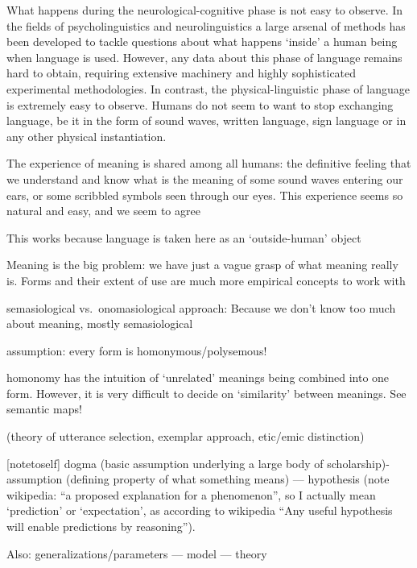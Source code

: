 What happens during the neurological-cognitive phase is not easy to observe. In the fields of psycholinguistics and neurolinguistics a large arsenal of methods has been developed to tackle questions about what happens `inside' a human being when language is used. However, any data about this phase of language remains hard to obtain, requiring extensive machinery and highly sophisticated experimental methodologies. In contrast, the physical-linguistic phase of language is extremely easy to observe. Humans do not seem to want to stop exchanging language, be it in the form of sound waves, written language, sign language or in any other physical instantiation.

%

%
The experience of meaning is shared among all humans: the definitive feeling that we understand and know what is the meaning of some sound waves entering our ears, or some scribbled symbols seen through our eyes. This experience seems so natural and easy, and we seem to agree

This works because language is taken here as an `outside-human' object

Meaning is the big problem: we have just a vague grasp of what meaning really is. Forms and their extent of use are much more empirical concepts to work with

semasiological vs.~onomasiological approach: Because we don't know too much about meaning, mostly semasiological


%
assumption: every form is homonymous/polysemous!

homonomy has the intuition of `unrelated' meanings being combined into one form. However, it is very difficult to decide on `similarity' between meanings. See semantic maps!

(theory of utterance selection, exemplar approach, etic/emic distinction)

[notetoself] dogma (basic assumption underlying a large body of scholarship)- assumption (defining property of what something means) --- hypothesis (note wikipedia: ``a proposed explanation for a phenomenon'', so I actually mean `prediction' or `expectation', as according to wikipedia ``Any useful hypothesis will enable predictions by reasoning'').

Also: generalizations/parameters --- model --- theory 
